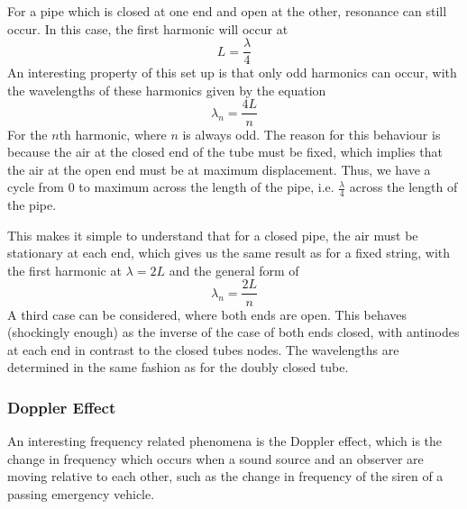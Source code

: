 \documentclass[12pt]{report}
\begin{document}
\begin{flushleft}
\bigskip
For a pipe which is closed at one end and open at the other, resonance can 
still occur. In this case, the first harmonic will occur at 
\[L = \frac{\lambda}{4}\]
An interesting property of this set up is that only odd harmonics can occur,
with the wavelengths of these harmonics given by the equation
\[\lambda_n = \frac{4L}{n}\]
For the \(n\)th harmonic, where \(n\) is always odd. The reason for this 
behaviour is because the air at the closed end of the tube must be fixed, which
implies that the air at the open end must be at maximum displacement. Thus, we
have a cycle from \(0\) to maximum across the length of the pipe, i.e. 
\(\frac{\lambda}{4}\) across the length of the pipe.

\bigskip
This makes it simple to understand that for a closed pipe, the air must be
stationary at each end, which gives us the same result as for a fixed string,
with the first harmonic at \(\lambda = 2L\) and the general form of
\[\lambda_n = \frac{2L}{n}\]
A third case can be considered, where both ends are open. This behaves 
(shockingly enough) as the inverse of the case of both ends closed, with 
antinodes at each end in contrast to the closed tubes nodes. The wavelengths
are determined in the same fashion as for the doubly closed tube.

\subsubsection*{Doppler Effect}
An interesting frequency related phenomena is the Doppler effect, which is the
change in frequency which occurs when a sound source and an observer are moving
relative to each other, such as the change in frequency of the siren of a
passing emergency vehicle.


\end{flushleft}
\end{document}
